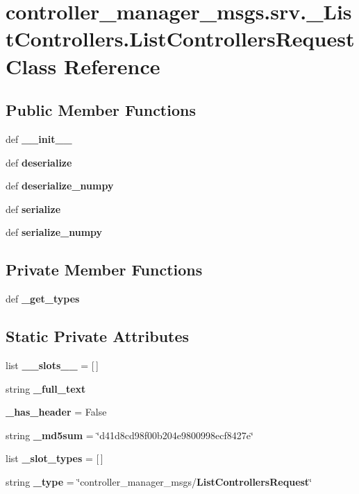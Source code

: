 \section{controller\-\_\-manager\-\_\-msgs.\-srv.\-\_\-\-List\-Controllers.\-List\-Controllers\-Request \-Class \-Reference}
\label{classcontroller__manager__msgs_1_1srv_1_1__ListControllers_1_1ListControllersRequest}
\subsection*{\-Public \-Member \-Functions}
\begin{DoxyCompactItemize}
\item 
def {\bf \-\_\-\-\_\-init\-\_\-\-\_\-}
\item 
def {\bf deserialize}
\item 
def {\bf deserialize\-\_\-numpy}
\item 
def {\bf serialize}
\item 
def {\bf serialize\-\_\-numpy}
\end{DoxyCompactItemize}
\subsection*{\-Private \-Member \-Functions}
\begin{DoxyCompactItemize}
\item 
def {\bf \-\_\-get\-\_\-types}
\end{DoxyCompactItemize}
\subsection*{\-Static \-Private \-Attributes}
\begin{DoxyCompactItemize}
\item 
list {\bf \-\_\-\-\_\-slots\-\_\-\-\_\-} = [$\,$]
\item 
string {\bf \-\_\-full\-\_\-text}
\item 
{\bf \-\_\-has\-\_\-header} = \-False
\item 
string {\bf \-\_\-md5sum} = \char`\"{}d41d8cd98f00b204e9800998ecf8427e\char`\"{}
\item 
list {\bf \-\_\-slot\-\_\-types} = [$\,$]
\item 
string {\bf \-\_\-type} = \char`\"{}controller\-\_\-manager\-\_\-msgs/{\bf \-List\-Controllers\-Request}\char`\"{}
\end{DoxyCompactItemize}


